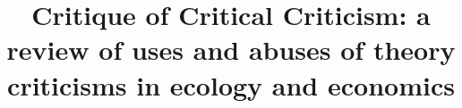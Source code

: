 \documentclass[a4paper, 9pt]{article}
\title{Critique of Critical Criticism: a review of uses and abuses of theory criticisms in ecology and economics}
\begin{document}
		
	\maketitle
	
	\begin{abstract}
		
	\end{abstract}
	
\end{document}
